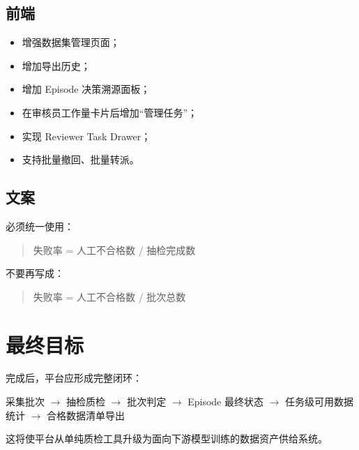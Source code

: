 \documentclass[UTF8,12pt,a4paper]{ctexart}
\begin{document}
\subsection{前端}

\begin{itemize}
  \item 增强数据集管理页面；
  \item 增加导出历史；
  \item 增加 Episode 决策溯源面板；
  \item 在审核员工作量卡片后增加“管理任务”；
  \item 实现 Reviewer Task Drawer；
  \item 支持批量撤回、批量转派。
\end{itemize}

\subsection{文案}

必须统一使用：

\begin{quote}
失败率 = 人工不合格数 / 抽检完成数
\end{quote}

不要再写成：

\begin{quote}
失败率 = 人工不合格数 / 批次总数
\end{quote}

\section{最终目标}

完成后，平台应形成完整闭环：

\begin{center}
采集批次 $\rightarrow$ 抽检质检 $\rightarrow$ 批次判定 $\rightarrow$ Episode 最终状态 $\rightarrow$ 任务级可用数据统计 $\rightarrow$ 合格数据清单导出
\end{center}

这将使平台从单纯质检工具升级为面向下游模型训练的数据资产供给系统。
\end{document}
